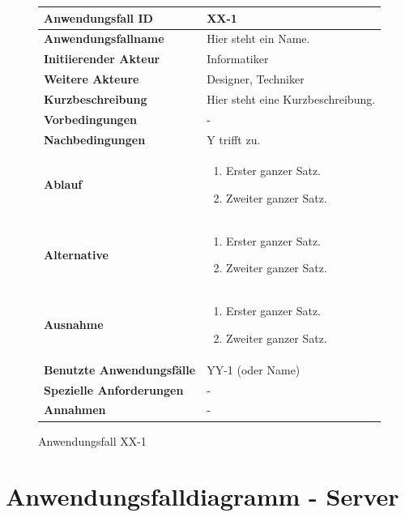 \begin{figure}[h]
	\centering
	\begin{tabularx}{\textwidth}{ X | X }
		\textbf{Anwendungsfall ID} & XX-1 \\ \hline
		\textbf{Anwendungsfallname} & Hier steht ein Name. \\ \hline
		\textbf{Initiierender Akteur} & Informatiker \\ \hline
		\textbf{Weitere Akteure} & Designer, Techniker  \\ \hline
		\textbf{Kurzbeschreibung} & Hier steht eine Kurzbeschreibung.  \\ \hline
		\textbf{Vorbedingungen} & -  \\ \hline
		\textbf{Nachbedingungen} & Y trifft zu.  \\ \hline
		\textbf{Ablauf} &
			\begin{enumerate}
				\item Erster ganzer Satz.
				\item Zweiter ganzer Satz.
			\end{enumerate} \\ \hline
		\textbf{Alternative} &
				\begin{enumerate}
					\item Erster ganzer Satz.
					\item Zweiter ganzer Satz.
				\end{enumerate}  \\ \hline
		\textbf{Ausnahme} &
				\begin{enumerate}
					\item Erster ganzer Satz.
					\item Zweiter ganzer Satz.
				\end{enumerate}  \\ \hline
		\textbf{Benutzte Anwendungsfälle} & YY-1 (oder Name) \\ \hline
		\textbf{Spezielle Anforderungen} & - \\ \hline
		\textbf{Annahmen} & -
	\end{tabularx}
	\caption{Anwendungsfall XX-1}
	\label{fig:anwendungsfall-app-tabelle-xx-1}
\end{figure}

\newpage



\section{Anwendungsfalldiagramm - Server}

